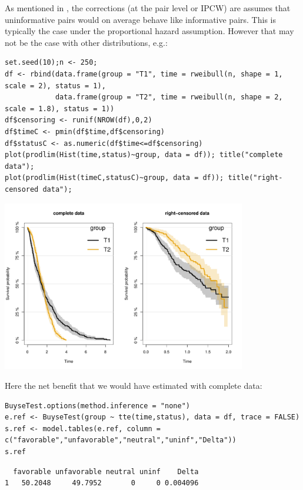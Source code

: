 \documentclass[12pt]{article}
\begin{document}
As mentioned in \cite{peron2021correcting}, the corrections (at the pair
level or IPCW) are assumes that uninformative pairs would on average
behave like informative pairs. This is typically the case under the
proportional hazard assumption. However that may not be the case with
other distributions, e.g.:
\lstset{language=r,label= ,caption= ,captionpos=b,numbers=none}
\begin{lstlisting}
set.seed(10);n <- 250; 
df <- rbind(data.frame(group = "T1", time = rweibull(n, shape = 1, scale = 2), status = 1),
            data.frame(group = "T2", time = rweibull(n, shape = 2, scale = 1.8), status = 1))
df$censoring <- runif(NROW(df),0,2)
df$timeC <- pmin(df$time,df$censoring)
df$statusC <- as.numeric(df$time<=df$censoring)
plot(prodlim(Hist(time,status)~group, data = df)); title("complete data");
plot(prodlim(Hist(timeC,statusC)~group, data = df)); title("right-censored data");
\end{lstlisting}
\begin{center}
\includegraphics[width=0.8\textwidth]{./figures/plot-crossingSurv.pdf}
\end{center}

Here the net benefit that we would have estimated with complete data:
\lstset{language=r,label= ,caption= ,captionpos=b,numbers=none}
\begin{lstlisting}
BuyseTest.options(method.inference = "none")
e.ref <- BuyseTest(group ~ tte(time,status), data = df, trace = FALSE)
s.ref <- model.tables(e.ref, column = c("favorable","unfavorable","neutral","uninf","Delta"))
s.ref
\end{lstlisting}

\begin{verbatim}
  favorable unfavorable neutral uninf    Delta
1   50.2048     49.7952       0     0 0.004096
\end{verbatim}
\end{document}
